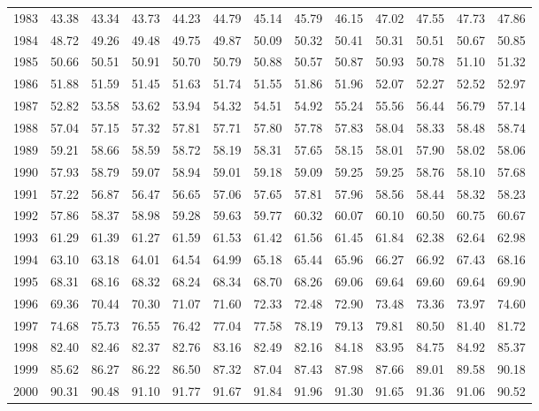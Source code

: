 \begin{longtable}{rrrrrrrrrrrrr}
  1983 & 43.38 & 43.34 & 43.73 & 44.23 & 44.79 & 45.14 & 45.79 & 46.15 & 47.02 & 47.55 & 47.73 & 47.86 \\ 
  1984 & 48.72 & 49.26 & 49.48 & 49.75 & 49.87 & 50.09 & 50.32 & 50.41 & 50.31 & 50.51 & 50.67 & 50.85 \\ 
  1985 & 50.66 & 50.51 & 50.91 & 50.70 & 50.79 & 50.88 & 50.57 & 50.87 & 50.93 & 50.78 & 51.10 & 51.32 \\ 
  1986 & 51.88 & 51.59 & 51.45 & 51.63 & 51.74 & 51.55 & 51.86 & 51.96 & 52.07 & 52.27 & 52.52 & 52.97 \\ 
  1987 & 52.82 & 53.58 & 53.62 & 53.94 & 54.32 & 54.51 & 54.92 & 55.24 & 55.56 & 56.44 & 56.79 & 57.14 \\ 
  1988 & 57.04 & 57.15 & 57.32 & 57.81 & 57.71 & 57.80 & 57.78 & 57.83 & 58.04 & 58.33 & 58.48 & 58.74 \\ 
  1989 & 59.21 & 58.66 & 58.59 & 58.72 & 58.19 & 58.31 & 57.65 & 58.15 & 58.01 & 57.90 & 58.02 & 58.06 \\ 
  1990 & 57.93 & 58.79 & 59.07 & 58.94 & 59.01 & 59.18 & 59.09 & 59.25 & 59.25 & 58.76 & 58.10 & 57.68 \\ 
  1991 & 57.22 & 56.87 & 56.47 & 56.65 & 57.06 & 57.65 & 57.81 & 57.96 & 58.56 & 58.44 & 58.32 & 58.23 \\ 
  1992 & 57.86 & 58.37 & 58.98 & 59.28 & 59.63 & 59.77 & 60.32 & 60.07 & 60.10 & 60.50 & 60.75 & 60.67 \\ 
  1993 & 61.29 & 61.39 & 61.27 & 61.59 & 61.53 & 61.42 & 61.56 & 61.45 & 61.84 & 62.38 & 62.64 & 62.98 \\ 
  1994 & 63.10 & 63.18 & 64.01 & 64.54 & 64.99 & 65.18 & 65.44 & 65.96 & 66.27 & 66.92 & 67.43 & 68.16 \\ 
  1995 & 68.31 & 68.16 & 68.32 & 68.24 & 68.34 & 68.70 & 68.26 & 69.06 & 69.64 & 69.60 & 69.64 & 69.90 \\ 
  1996 & 69.36 & 70.44 & 70.30 & 71.07 & 71.60 & 72.33 & 72.48 & 72.90 & 73.48 & 73.36 & 73.97 & 74.60 \\ 
  1997 & 74.68 & 75.73 & 76.55 & 76.42 & 77.04 & 77.58 & 78.19 & 79.13 & 79.81 & 80.50 & 81.40 & 81.72 \\ 
  1998 & 82.40 & 82.46 & 82.37 & 82.76 & 83.16 & 82.49 & 82.16 & 84.18 & 83.95 & 84.75 & 84.92 & 85.37 \\ 
  1999 & 85.62 & 86.27 & 86.22 & 86.50 & 87.32 & 87.04 & 87.43 & 87.98 & 87.66 & 89.01 & 89.58 & 90.18 \\ 
  2000 & 90.31 & 90.48 & 91.10 & 91.77 & 91.67 & 91.84 & 91.96 & 91.30 & 91.65 & 91.36 & 91.06 & 90.52 \\ 

\end{longtable}
